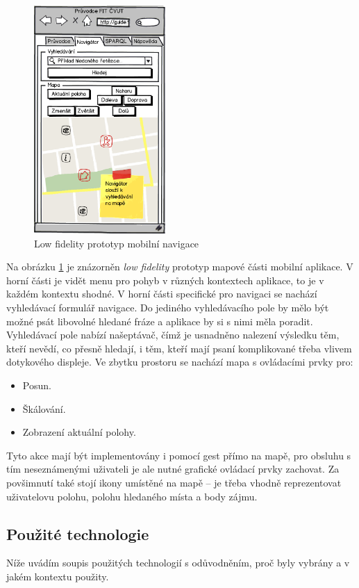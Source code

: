 \begin{figure}[h]
 \centering
 \includegraphics[width=5cm,keepaspectratio=true]{./figures/mockup-navigator.png}
 \caption{Low fidelity prototyp mobilní navigace}
 \label{fig:mobil:mockup:navigator}
\end{figure}

Na obrázku \ref{fig:mobil:mockup:navigator} je znázorněn \textit{low fidelity} prototyp mapové části mobilní aplikace. V horní části je vidět menu pro pohyb v různých kontextech aplikace, to je v každém kontextu shodné. V horní části specifické pro navigaci se nachází vyhledávací formulář navigace. Do jediného vyhledávacího pole by mělo být možné psát libovolné hledané fráze a aplikace by si s nimi měla poradit. Vyhledávací pole nabízí našeptávač, čímž je usnadněno nalezení výsledku těm, kteří nevědí, co přesně hledají, i těm, kteří mají psaní komplikované třeba vlivem dotykového displeje. Ve zbytku prostoru se nachází mapa s ovládacími prvky pro:
\begin{itemize}
 \item Posun.
 \item Škálování.
 \item Zobrazení aktuální polohy.
\end{itemize}
Tyto akce mají být implementovány i pomocí gest přímo na mapě, pro obsluhu s tím neseznámenými uživateli je ale nutné grafické ovládací prvky zachovat. Za povšimnutí také stojí ikony umístěné na mapě -- je třeba vhodně reprezentovat uživatelovu polohu, polohu hledaného místa a body zájmu.


\subsection{Použité technologie}
Níže uvádím soupis použitých technologií s odůvodněním, proč byly vybrány a v jakém kontextu použity.


